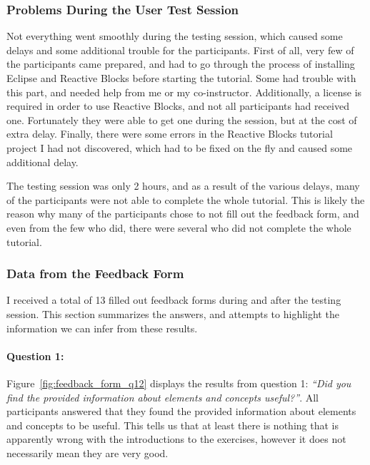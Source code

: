 \subsubsection{Problems During the User Test Session}
Not everything went smoothly during the testing session, which caused some delays and some additional trouble for the participants. First of all, very few of the participants came prepared, and had to go through the process of installing Eclipse and Reactive Blocks before starting the tutorial. Some had trouble with this part, and needed help from me or my co-instructor. Additionally, a license is required in order to use Reactive Blocks, and not all participants had received one. Fortunately they were able to get one during the session, but at the cost of extra delay. Finally, there were some errors in the Reactive Blocks tutorial project I had not discovered, which had to be fixed on the fly and caused some additional delay.

\noindent
The testing session was only 2 hours, and as a result of the various delays, many of the participants were not able to complete the whole tutorial. This is likely the reason why many of the participants chose to not fill out the feedback form, and even from the few who did, there were several who did not complete the whole tutorial.

\subsubsection{Data from the Feedback Form}
I received a total of 13 filled out feedback forms during and after the testing session. This section summarizes the answers, and attempts to highlight the information we can infer from these results.

\paragraph{Question 1:} Figure~\ref{fig:feedback_form_q12} displays the results from question 1: \emph{``Did you find the provided information about elements and concepts useful?''}. All participants answered that they found the provided information about elements and concepts to be useful. This tells us that at least there is nothing that is apparently wrong with the introductions to the exercises, however it does not necessarily mean they are very good.

